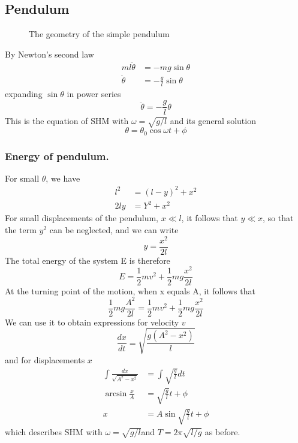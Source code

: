 \documentclass[../../../main.tex]{subfiles}
\begin{document}
\subsection*{Pendulum}
\begin{figure*}[b]
    \centering
    \caption*{The geometry of the simple pendulum}
\end{figure*}
By Newton's second law 
\begin{align*}
    ml\ddot{\theta}&=-mg\sin\theta\\
\ddot{\theta}&=-\frac{g}{l}\sin \theta
\end{align*}
expanding $\sin\theta $ in power series
\begin{equation*}
    \ddot{\theta}=-\frac{g}{l}\theta
\end{equation*}
This is the equation of SHM with $ \omega=\sqrt{g/ l}$ and its general solution 
\begin{equation*}
    \theta=\theta_0 \cos \omega t +\phi
\end{equation*}

\subsubsection*{Energy of pendulum.} For small $\theta$, we have
\begin{align*}
    l^2& = (l - y)^2 + x^2\\
    2ly&=Y^2+x^2
\end{align*}
For small displacements of the pendulum, $x\ll l $, it follows that $ y \ll x$, so that the term $y^2$ can be neglected, and we can write
\begin{equation*}
    y=\frac{x^2}{2l}
\end{equation*}
The total energy of the system E is therefore\begin{equation*}
    E=\frac{1}{2}mv^2+\frac{1}{2}mg\frac{x^2}{2l}
\end{equation*}
At the turning point of the motion, when x equals A, it follows that
\begin{equation*}
    \frac{1}{2}mg\frac{A^2}{2l}=\frac{1}{2}mv^2+\frac{1}{2}mg\frac{x^2}{2l}
\end{equation*}
We can use it to obtain expressions for velocity $v$ 
\begin{equation*}
    \frac{dx}{dt}=\sqrt{\frac{g(A^2-x^2)}{l}}
\end{equation*}
and for displacements $x$
\begin{align*}
    \int \frac{dx}{\sqrt{A^2-x^2}}&=\int \sqrt{\frac{g}{l}}dt\\
    \arcsin \frac{x}{A}&= \sqrt{\frac{g}{l}}t+\phi\\
    x&=A\sin \sqrt{\frac{g}{l}}t+\phi
\end{align*}
which describes SHM with $\omega = \sqrt{g/ l} $and $T = 2\pi \sqrt{l/g}$ as before.
\end{document}
